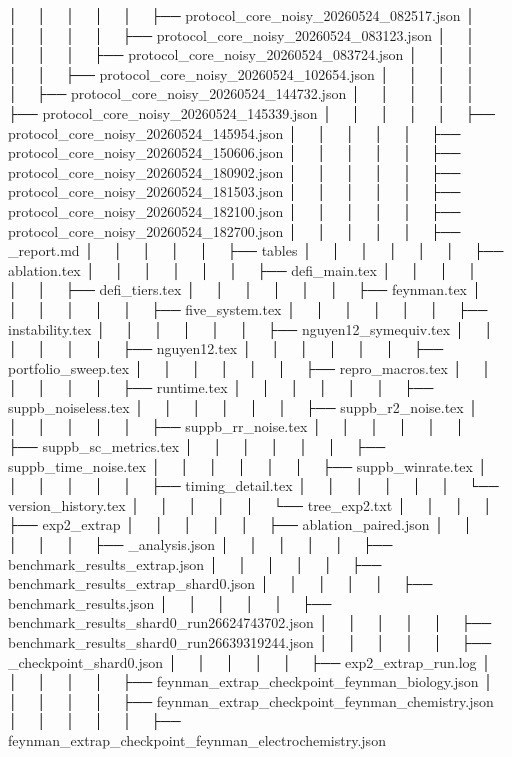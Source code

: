 │   │       │   │   │   ├── protocol_core_noisy_20260524_082517.json
│   │       │   │   │   ├── protocol_core_noisy_20260524_083123.json
│   │       │   │   │   ├── protocol_core_noisy_20260524_083724.json
│   │       │   │   │   ├── protocol_core_noisy_20260524_102654.json
│   │       │   │   │   ├── protocol_core_noisy_20260524_144732.json
│   │       │   │   │   ├── protocol_core_noisy_20260524_145339.json
│   │       │   │   │   ├── protocol_core_noisy_20260524_145954.json
│   │       │   │   │   ├── protocol_core_noisy_20260524_150606.json
│   │       │   │   │   ├── protocol_core_noisy_20260524_180902.json
│   │       │   │   │   ├── protocol_core_noisy_20260524_181503.json
│   │       │   │   │   ├── protocol_core_noisy_20260524_182100.json
│   │       │   │   │   ├── protocol_core_noisy_20260524_182700.json
│   │       │   │   │   ├── _report.md
│   │       │   │   │   ├── tables
│   │       │   │   │   │   ├── ablation.tex
│   │       │   │   │   │   ├── defi_main.tex
│   │       │   │   │   │   ├── defi_tiers.tex
│   │       │   │   │   │   ├── feynman.tex
│   │       │   │   │   │   ├── five_system.tex
│   │       │   │   │   │   ├── instability.tex
│   │       │   │   │   │   ├── nguyen12_symequiv.tex
│   │       │   │   │   │   ├── nguyen12.tex
│   │       │   │   │   │   ├── portfolio_sweep.tex
│   │       │   │   │   │   ├── repro_macros.tex
│   │       │   │   │   │   ├── runtime.tex
│   │       │   │   │   │   ├── suppb_noiseless.tex
│   │       │   │   │   │   ├── suppb_r2_noise.tex
│   │       │   │   │   │   ├── suppb_rr_noise.tex
│   │       │   │   │   │   ├── suppb_sc_metrics.tex
│   │       │   │   │   │   ├── suppb_time_noise.tex
│   │       │   │   │   │   ├── suppb_winrate.tex
│   │       │   │   │   │   ├── timing_detail.tex
│   │       │   │   │   │   └── version_history.tex
│   │       │   │   │   └── tree_exp2.txt
│   │       │   │   ├── exp2_extrap
│   │       │   │   │   ├── ablation_paired.json
│   │       │   │   │   ├── _analysis.json
│   │       │   │   │   ├── benchmark_results_extrap.json
│   │       │   │   │   ├── benchmark_results_extrap_shard0.json
│   │       │   │   │   ├── benchmark_results.json
│   │       │   │   │   ├── benchmark_results_shard0_run26624743702.json
│   │       │   │   │   ├── benchmark_results_shard0_run26639319244.json
│   │       │   │   │   ├── _checkpoint_shard0.json
│   │       │   │   │   ├── exp2_extrap_run.log
│   │       │   │   │   ├── feynman_extrap_checkpoint_feynman_biology.json
│   │       │   │   │   ├── feynman_extrap_checkpoint_feynman_chemistry.json
│   │       │   │   │   ├── feynman_extrap_checkpoint_feynman_electrochemistry.json
